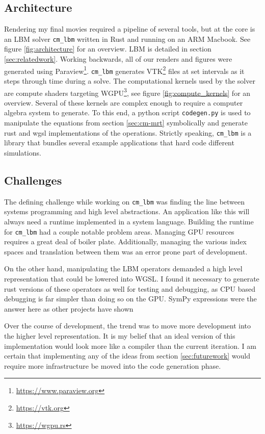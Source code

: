 \subsection{Architecture}\label{sec:architecture}

Rendering my final movies required a pipeline of several tools,
but at the core is an LBM solver \lstinline{cm_lbm} written in Rust 
and running on an ARM Macbook.
See figure \ref{fig:architecture} for an overview.
LBM is detailed in section \ref{sec:relatedwork}. 
Working backwards, all of our renders
and figures were generated using 
Paraview\footnote{\url{https://www.paraview.org}}.
\lstinline{cm_lbm} generates 
VTK\footnote{\url{https://vtk.org}} files at set intervals as it 
steps through time during a solve.
The computational kernels used by the solver are 
compute shaders targeting WGPU\footnote{\url{https://wgpu.rs}},
see figure \ref{fig:compute_kernels} for an overview.
Several of these kernels are complex enough
to require a computer algebra system to generate.
To this end, a python script \lstinline{codegen.py}
is used to manipulate the equations from section \ref{sec:cm-mrt}
symbolically and generate
rust and wgsl implementations of the operations.
Strictly speaking, \lstinline{cm_lbm} is a library 
that bundles several example applications 
that hard code different simulations.

\subsection{Challenges}
The defining challenge while working on \lstinline{cm_lbm} was finding
the line between systems programming and high level abstractions.
An application like this will always 
need a runtime implemented in a system language.
Building the runtime for \lstinline{cm_lbm} had a couple notable 
problem areas.
Managing GPU resources requires a great deal of boiler plate.
Additionally, managing the various index spaces and translation
between them was an error prone part of development.

On the other hand, manipulating the LBM operators
demanded a high level representation that could be lowered
into WGSL.
I found it necessary to generate rust versions of these
operators as well for testing and debugging, as 
CPU based debugging is far simpler than doing so on the GPU.
SymPy expressions were the answer here as other projects have shown

Over the course of development, the trend was to move
more development into the higher level representation.
It is my belief that an ideal version of this implementation would
look more like a compiler than the current iteration.
I am certain that implementing any of the ideas from 
section \ref{sec:futurework}
would require more infrastructure be moved into the 
code generation phase.

